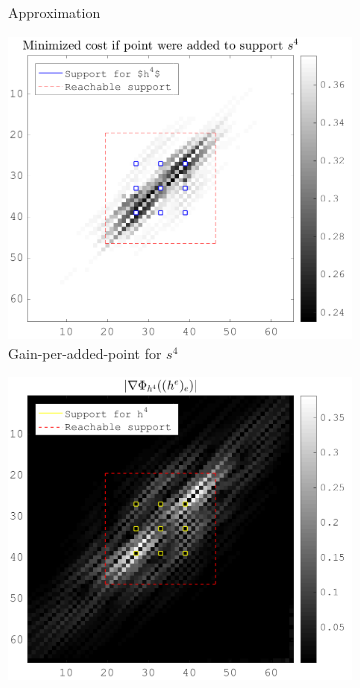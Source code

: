 \begin{figure}[!ht]
\begin{subfigure}[b]{0.49\textwidth}
\caption{Approximation} \label{fig_gain_vs_grad_approx}
\end{subfigure}
\begin{subfigure}[b]{0.49\textwidth}\centering
\includegraphics[width=\textwidth]{figures/xp/xp_128x128_sc2_angl1_K3_S3_node4_objmatrix.png}
\caption{Gain-per-added-point for $s^4$}
\end{subfigure}
\begin{subfigure}[b]{0.49\textwidth}\centering
\includegraphics[width=\textwidth]{figures/xp/xp_128x128_sc2_angl1_K3_S3_node4_partgrad4.png}

\end{subfigure}
\end{figure}
